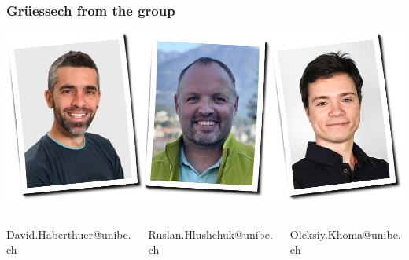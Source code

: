 \begin{frame}
  \frametitle{Grüessech from the \uct group}
  \centering%
  \includegraphics[width=\imagewidth]{./images/team}
  \begin{columns}[t,onlytextwidth]
    \hfill%
    \begin{column}{0.3\linewidth}
      David{\color{ubRed}.}Haberthuer{\color{ubRed}@unibe.ch}%
    \end{column}%
    \hfill%
    \begin{column}{0.3\linewidth}
      Ruslan{\color{ubRed}.}Hlushchuk{\color{ubRed}@unibe.ch}%
    \end{column}%
    \hfill%
    \begin{column}{0.3\linewidth}
      Oleksiy{\color{ubRed}.}Khoma{\color{ubRed}@unibe.ch}%
    \end{column}%
    \hfill%
  \end{columns}
\end{frame}

